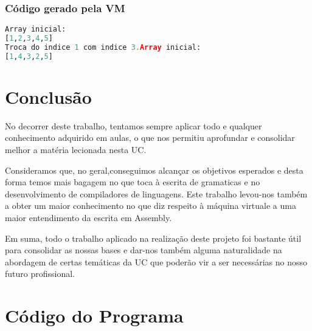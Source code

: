 \documentclass[11pt,a4paper]{report}%
\begin{document}
\subsection{Código gerado pela VM}
\begin{lstlisting}[language=python]
Array inicial:
[1,2,3,4,5]
Troca do indice 1 com indice 3.Array inicial:
[1,4,3,2,5]
\end{lstlisting}





\chapter{Conclusão}
No decorrer deste trabalho, tentamos sempre aplicar todo e qualquer conhecimento adquirido em aulas, o que nos permitiu aprofundar e consolidar melhor a matéria lecionada nesta UC.

Consideramos que, no geral,conseguimos alcançar os objetivos esperados e desta forma temos mais bagagem no que toca à escrita de gramaticas e no desenvolvimento de compiladores de linguagens.
Este trabalho levou-nos também a obter um maior conhecimento no que diz respeito à máquina virtuale a uma maior entendimento da escrita em Assembly.

Em suma, todo o trabalho aplicado na realização deste projeto foi bastante útil para consolidar as nossas bases e dar-nos também alguma naturalidade na abordagem de certas temáticas da UC que poderão vir a ser necessárias no nosso futuro profissional.

\appendix %
\chapter{Código do Programa}
\end{document}
